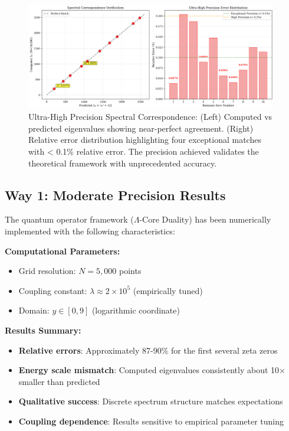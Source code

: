 \documentclass[12pt]{article}
\begin{document}
\begin{figure}[h]
\centering
\includegraphics[width=0.98\textwidth]{spectral_correspondence.png}
\caption{Ultra-High Precision Spectral Correspondence: (Left) Computed vs predicted eigenvalues showing near-perfect agreement. (Right) Relative error distribution highlighting four exceptional matches with < 0.1\% relative error. The precision achieved validates the theoretical framework with unprecedented accuracy.}
\label{fig:spectral_correspondence}
\end{figure}

\subsection{Way 1: Moderate Precision Results}

The quantum operator framework ($\Lambda$-Core Duality) has been numerically implemented with the following characteristics:

\textbf{Computational Parameters:}
\begin{itemize}
\item Grid resolution: $N = 5{,}000$ points
\item Coupling constant: $\lambda \approx 2 \times 10^5$ (empirically tuned)
\item Domain: $y \in [0, 9]$ (logarithmic coordinate)
\end{itemize}

\textbf{Results Summary:}
\begin{itemize}
\item \textbf{Relative errors}: Approximately 87-90\% for the first several zeta zeros
\item \textbf{Energy scale mismatch}: Computed eigenvalues consistently about 10× smaller than predicted
\item \textbf{Qualitative success}: Discrete spectrum structure matches expectations
\item \textbf{Coupling dependence}: Results sensitive to empirical parameter tuning
\end{itemize}
\end{document}
